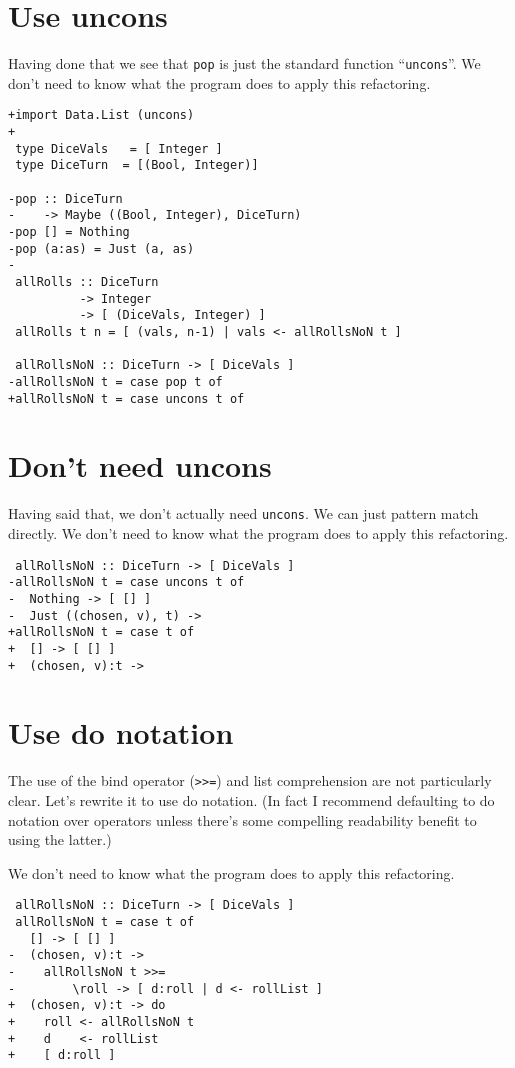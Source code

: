 \section{Use uncons}

Having done that we see that \texttt{pop} is just the standard function ``\texttt{uncons}''. We don't need to know what the program does to apply this refactoring.

\begin{verbatim}
+import Data.List (uncons)
+
 type DiceVals   = [ Integer ]
 type DiceTurn  = [(Bool, Integer)]

-pop :: DiceTurn
-    -> Maybe ((Bool, Integer), DiceTurn)
-pop [] = Nothing
-pop (a:as) = Just (a, as)
-
 allRolls :: DiceTurn
          -> Integer
          -> [ (DiceVals, Integer) ]
 allRolls t n = [ (vals, n-1) | vals <- allRollsNoN t ]

 allRollsNoN :: DiceTurn -> [ DiceVals ]
-allRollsNoN t = case pop t of
+allRollsNoN t = case uncons t of
\end{verbatim}


\section{Don't need uncons}


Having said that, we don't actually need \texttt{uncons}. We can just pattern match directly. We don't need to know what the program does to apply this refactoring.

\begin{verbatim}
 allRollsNoN :: DiceTurn -> [ DiceVals ]
-allRollsNoN t = case uncons t of
-  Nothing -> [ [] ]
-  Just ((chosen, v), t) ->
+allRollsNoN t = case t of
+  [] -> [ [] ]
+  (chosen, v):t ->
\end{verbatim}

\section{Use do notation}

The use of the bind operator (\texttt{>>=}) and list comprehension are not particularly clear. Let's rewrite it to use do notation. (In fact I recommend defaulting to do notation over operators unless there's some compelling readability benefit to using the latter.)

We don't need to know what the program does to apply this refactoring.

\begin{verbatim}
 allRollsNoN :: DiceTurn -> [ DiceVals ]
 allRollsNoN t = case t of
   [] -> [ [] ]
-  (chosen, v):t ->
-    allRollsNoN t >>=
-        \roll -> [ d:roll | d <- rollList ]
+  (chosen, v):t -> do
+    roll <- allRollsNoN t
+    d    <- rollList
+    [ d:roll ]
\end{verbatim}


